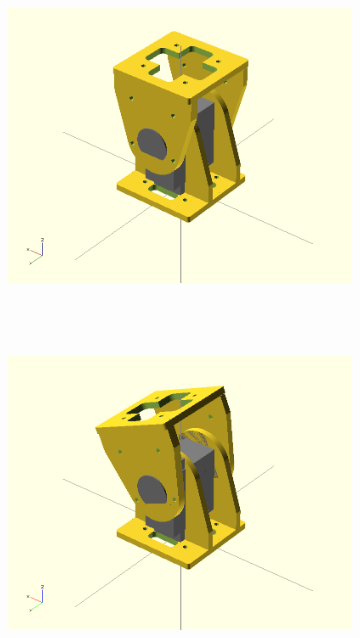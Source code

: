 \begin{figure}[h]
\begin{subfigure}[b]{0.18\textwidth}
        \end{subfigure}
        ~
        \begin{subfigure}[b]{0.18\textwidth}
         	   \centering
                \includegraphics[width=\textwidth]{images/Gait_osc_center_90.png}
                 ~
                \label{fig:Gait_osc_center_90-2}
        \end{subfigure}
        ~
                \begin{subfigure}[b]{0.18\textwidth}
                \centering
                \includegraphics[width=\textwidth]{images/Gait_osc_center_62_5.png}
                ~

\end{subfigure}
\end{figure}
